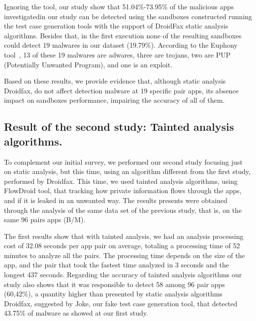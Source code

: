 Ignoring the \joke tool, our study show that 51.04\%-73.95\% of the malicious apps investigatedin our study can be detected using the sandboxes constructed running the test case generation tools with the support of DroidFax static analysis algorithms. Besides that, in the first execution none of the resulting sandboxes could detect 19 malwares in our dataset (19.79\%). According to the Euphony tool~\cite{hurier2017euphony}, 13 of these 19 malwares are adwares, three are trojans, two are PUP (Potentially Unwanted Program), and one is an exploit. 




\begin{finding}
Based on these results, we provide evidence that, although static analysis Droidfax, do not affect detection malware at 19 specific pair apps, its absence impact on sandboxes performance, impairing the accuracy of all of them.
\end{finding}

\subsection{Result of the second study: Tainted analysis algorithms.}\label{sec:res-ss}

To complement our initial survey, we performed our second study focusing just on static analysis, but this time, using an algorithm different from the first study, performed by Droidfax. This time, we used tainted analysis algorithms, using FlowDroid tool, that tracking how private information flows through the apps, and if it is leaked in an unwanted way. The results presents were obtained through the analysis of the same data set of the previous study, that is, on the same 96 pairs apps (B/M).

The first results show that with tainted analysis, we had an analysis processing cost of 32.08 seconds per app pair on average, totaling a processing time of 52 minutes to analyze all the pairs. The processing time depends on the size of the app, and the pair that took the fastest time analyzed in 3 seconds and the longest 437 seconds. Regarding the accuracy of tainted analysis algorithms our study also shows that it was responsible to detect 58 among 96 pair apps (60,42\%), a quantity higher than presented by static analysis algorithms Droidfax, suggested by Joke, our fake test case generation tool, that detected 43.75\% of malware as showed at our first study.

